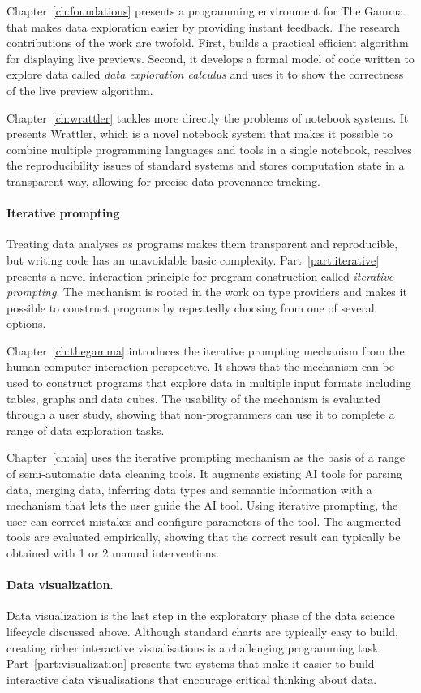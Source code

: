 \documentclass[fleqn,11pt]{report}
\theoremstyle{definition}
\begin{document}
Chapter~\ref{ch:foundations} presents a programming environment for The Gamma that makes data
exploration easier by providing instant feedback. The research contributions of the work are
twofold. First, builds a practical efficient algorithm for displaying live previews. Second, it
develops a formal model of code written to explore data called \emph{data exploration calculus}
and uses it to show the correctness of the live preview algorithm.

Chapter~\ref{ch:wrattler} tackles more directly the problems of notebook systems. It presents
Wrattler, which is a novel notebook system that makes it possible to combine multiple
programming languages and tools in a single notebook, resolves the reproducibility issues of
standard systems and stores computation state in a transparent way, allowing for precise
data provenance tracking.

\paragraph{Iterative prompting}
Treating data analyses as programs makes them transparent and reproducible, but writing code has
an unavoidable basic complexity. Part~\ref{part:iterative} presents a novel interaction principle for
program construction called \emph{iterative prompting}. The mechanism is rooted in the work on type
providers and makes it possible to construct programs by repeatedly choosing from one of several
options.

Chapter~\ref{ch:thegamma} introduces the iterative prompting mechanism from the human-computer
interaction perspective. It shows that the mechanism can be used to construct programs that
explore data in multiple input formats including tables, graphs and data cubes. The usability of
the mechanism is evaluated through a user study, showing that non-programmers can use it to
complete a range of data exploration tasks.

Chapter~\ref{ch:aia} uses the iterative prompting mechanism as the basis of a range of
semi-automatic data cleaning tools. It augments existing AI tools for parsing data, merging data,
inferring data types and semantic information with a mechanism that lets the user guide the AI
tool. Using iterative prompting, the user can correct mistakes and configure parameters of the tool.
The augmented tools are evaluated empirically, showing that the correct result can typically be
obtained with 1 or 2 manual interventions.

\paragraph{Data visualization.}
Data visualization is the last step in the exploratory phase of the data science lifecycle
discussed above. Although standard charts are typically easy to build, creating richer
interactive visualisations is a challenging programming task. Part~\ref{part:visualization}
presents two systems that make it easier to build interactive data visualisations that encourage
critical thinking about data.
\end{document}
